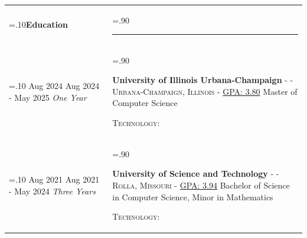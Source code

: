 \documentclass[10pt]{article}
\newcommand{\timeFrame}[3] {
  \if\relax\detokenize{#2}\relax
    #1
  \else
    #1 - #2
  \fi
  \newline
  \scriptsize \textit{#3}
}
\newcommand{\entry}[6] {
  \textbf{#1}
  \if\relax\detokenize{#2}\relax
  \else
       - \textsc{#2}
  \fi
  \if\relax\detokenize{#3}\relax
  \else
      - \textsc{#3}
  \fi
  \if\relax\detokenize{#4}\relax
  \else
      - \href{https://#4}{#4}
  \fi
  \newline #5
  \if\relax\detokenize{#6}\relax
  \else
      \newline \textsc{Technology:} #6
  \fi
  \\
}
\newcommand{\horizontalLine}[0] {
    \noindent\rule{.90\linewidth}{0.4pt}
}
\begin{document}
\begin{tabularx}{\linewidth}{>{\hsize=.10\hsize}X>{\hsize=.90\hsize}X}
\textbf{Education} & \horizontalLine \\

\timeFrame{Aug 2024}{May 2025}{One Year} &
\entry{University of Illinois Urbana-Champaign}
  {}
  {Urbana-Champaign, Illinois}
  {GPA: 3.80}
  {
  Master of Computer Science \newline
  }
  {}

\timeFrame{Aug 2021}{May 2024}{Three Years} &
\entry{University of Science and Technology}
  {}
  {Rolla, Missouri}
  {GPA: 3.94}
  {
  Bachelor of Science in Computer Science, Minor in Mathematics
  }
  {}

\end{tabularx}
\end{document}
